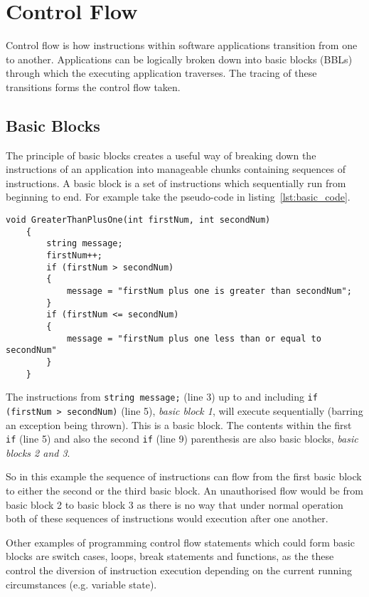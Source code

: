 \section{Control Flow}
Control flow is how instructions within software applications transition from one to another. Applications can be logically broken down into basic blocks (BBLs) through which the executing application traverses. The tracing of these transitions forms the control flow taken.

\subsection{Basic Blocks}
The principle of basic blocks creates a useful way of breaking down the instructions of an application into manageable chunks containing sequences of instructions. A basic block is a set of instructions which sequentially run from beginning to end. For example take the pseudo-code in listing~\ref{lst:basic_code}.

\begin{lstlisting}[language={[Sharp]C},caption={An example of code which can be broken down into basic blocks},label={lst:basic_code}]
void GreaterThanPlusOne(int firstNum, int secondNum)
    {
        string message;
        firstNum++;
        if (firstNum > secondNum)
        {
            message = "firstNum plus one is greater than secondNum";
        }
        if (firstNum <= secondNum)
        {
            message = "firstNum plus one less than or equal to secondNum"
        }
    }
\end{lstlisting}

The instructions from \verb|string message;| (line 3) up to and including \verb|if (firstNum > secondNum)| (line 5), \textit{basic block 1}, will execute sequentially (barring an exception being thrown). This is a basic block. The contents within the first \verb|if| (line 5) and also the second \verb|if| (line 9) parenthesis are also basic blocks, \textit{basic blocks 2 and 3}.

So in this example the sequence of instructions can flow from the first basic block to either the second or the third basic block. An unauthorised flow would be from basic block 2 to basic block 3 as there is no way that under normal operation both of these sequences of instructions would execution after one another.

Other examples of programming control flow statements which could form basic blocks are switch cases, loops, break statements and functions, as the these control the diversion of instruction execution depending on the current running circumstances (e.g. variable state).

